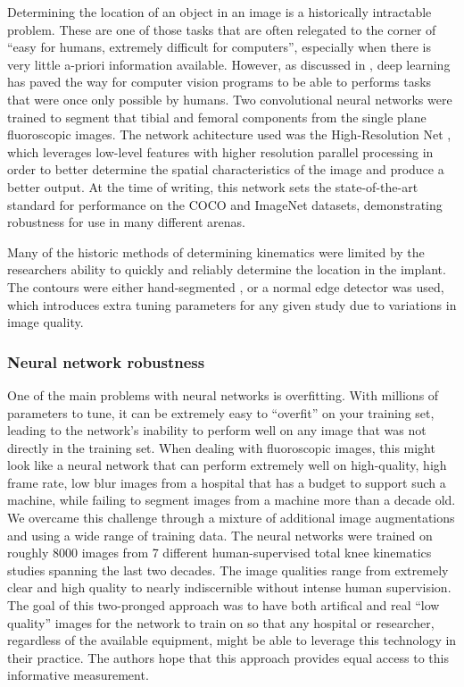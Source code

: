 Determining the location of an object in an image is a historically intractable problem. These are one of those tasks that are often relegated to the corner of ``easy for humans, extremely difficult for computers'', especially when there is very little a-priori information available. However, as discussed in , deep learning has paved the way for computer vision programs to be able to performs tasks that were once only possible by humans. Two convolutional neural networks were trained to segment that tibial and femoral components from the single plane fluoroscopic images. The network achitecture used was the High-Resolution Net \cite{wangDeepHighResolutionRepresentation2020}, which leverages low-level features with higher resolution parallel processing in order to better determine the spatial characteristics of the image and produce a better output. At the time of writing, this network sets the state-of-the-art standard for performance on the COCO and ImageNet datasets, demonstrating robustness for use in many different arenas.

Many of the historic methods of determining kinematics were limited by the researchers ability to quickly and reliably determine the location in the implant. The contours were either hand-segmented \cite{banksAccurateMeasurementThreedimensional1996, zuffiModelbasedMethodReconstruction1999}, or a normal edge detector was used, which introduces extra tuning parameters for any given study due to variations in image quality.


\subsubsection{Neural network robustness}
One of the main problems with neural networks is overfitting. With millions of parameters to tune, it can be extremely easy to ``overfit'' on your training set, leading to the network's inability to perform well on any image that was not directly in the training set. When dealing with fluoroscopic images, this might look like a neural network that can perform extremely well on high-quality, high frame rate, low blur images from a hospital that has a budget to support such a machine, while failing to segment images from a machine more than a decade old. We overcame this challenge through a mixture of additional image augmentations \cite{buslaevAlbumentationsFastFlexible2020} and using a wide range of training data. The neural networks were trained on roughly 8000 images from 7 different human-supervised total knee kinematics studies spanning the last two decades. The image qualities range from extremely clear and high quality to nearly indiscernible without intense human supervision. The goal of this two-pronged approach was to have both artifical and real ``low quality'' images for the network to train on so that any hospital or researcher, regardless of the available equipment, might be able to leverage this technology in their practice. The authors hope that this approach provides equal access to this informative measurement.
